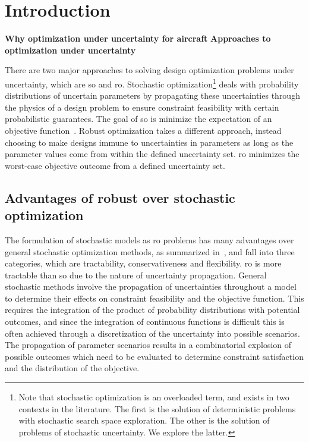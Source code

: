 \section{Introduction}

\textbf{Why optimization under uncertainty for aircraft}
\newline
\textbf{Approaches to optimization under uncertainty}

There are two major approaches to solving design optimization problems under uncertainty,
which are \gls{so} and \gls{ro}. Stochastic optimization\footnote{Note that stochastic
optimization is an overloaded term, and exists in two contexts in the literature. The first is the solution
of deterministic problems with stochastic search space exploration. The other is the solution
of problems of stochastic uncertainty. We explore the latter.}
deals with probability distributions of
uncertain parameters by propagating these uncertainties through the
physics of a design problem to ensure constraint feasibility with certain probabilistic guarantees.
The goal of \gls{so} is minimize the expectation of an objective function~\cite{Diwekar2008}.
Robust optimization takes a different approach, instead choosing to make designs immune to
uncertainties in parameters as long as the parameter values come from within the defined
uncertainty set. \gls{ro} minimizes the worst-case objective outcome from a defined uncertainty set.

\subsection{Advantages of robust over stochastic optimization}

The formulation of stochastic models as \gls{ro} problems has many advantages
over general stochastic optimization methods, as summarized in~\cite{Bertsimas2011},
and fall into three categories, which are tractability, conservativeness and flexibility.
\gls{ro} is more tractable than \gls{so} due to the nature of uncertainty propagation.
General stochastic methods involve the propagation of uncertainties throughout a model
to determine their effects on constraint feasibility and the objective function.
This requires the integration of the product of probability distributions with potential outcomes,
and since the integration of continuous functions is difficult this is often achieved through
a discretization of the uncertainty into possible scenarios. The propagation of parameter
scenarios results in a combinatorial explosion of possible outcomes which need to be evaluated to determine constraint
satisfaction and the distribution of the objective.

